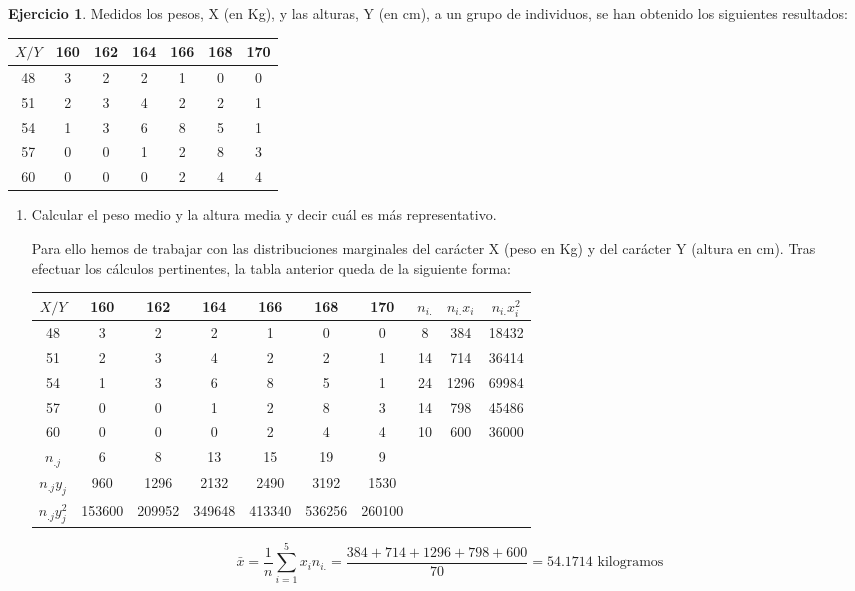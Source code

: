 \documentclass[a4paper, 12pt]{article}
\theoremstyle{definition}
\newtheorem{ej}{Ejercicio}
\begin{document}
\begin{ej}
Medidos los pesos, X (en Kg), y las alturas, Y (en cm), a un grupo de individuos, se han obtenido
los siguientes resultados:

\begin{center}
\begin{tabular}{c|cccccc}
	\(X/Y\) & 160 & 162 & 164 & 166 & 168 & 170 \\
	\hline
	48 & 3 & 2 & 2 & 1 & 0 & 0 \\
	51 & 2 & 3 & 4 & 2 & 2 & 1 \\
	54 & 1 & 3 & 6 & 8 & 5 & 1 \\
	57 & 0 & 0 & 1 & 2 & 8 & 3 \\
	60 & 0 & 0 & 0 & 2 & 4 & 4\\
\end{tabular}
\end{center}

\begin{enumerate}[label=\alph*)]
	\item Calcular el peso medio y la altura media y decir cuál es más representativo.
	
	Para ello hemos de trabajar con las distribuciones marginales del carácter X (peso en Kg) y del carácter Y (altura en cm). Tras efectuar los cálculos pertinentes, la tabla anterior queda de la siguiente forma:
	
	\begin{center}
\begin{tabular}{c|ccccccccc}
	\(X/Y\) & 160 & 162 & 164 & 166 & 168 & 170 & \(n_{i.}\) & \(n_{i.}x_i\) & \(n_{i.}x_i^2\) \\
	\hline
	48 & 3 & 2 & 2 & 1 & 0 & 0 & 8 & 384 & 18432 \\
	51 & 2 & 3 & 4 & 2 & 2 & 1 & 14 & 714 & 36414\\
	54 & 1 & 3 & 6 & 8 & 5 & 1 & 24 & 1296 & 69984\\
	57 & 0 & 0 & 1 & 2 & 8 & 3 & 14 & 798 & 45486\\
	60 & 0 & 0 & 0 & 2 & 4 & 4 & 10 & 600 & 36000\\
	\(n_{.j}\) & 6 & 8 & 13 & 15 & 19 & 9\\
	\(n_{.j} y_j\) & 960 & 1296 & 2132 & 2490 & 3192 & 1530\\
	\(n_{.j} y_j^2\) & 153600 & 209952 & 349648 & 413340 & 536256 & 260100\\
\end{tabular}
\end{center}

\[
	\bar{x} = \frac{1}{n} \sum_{i=1}^{5} x_i n_{i.} = \frac{384+714+1296+798+600}{70} = 54.1714 \text{ kilogramos} 
\]


\end{enumerate}
\end{ej}
\end{document}
